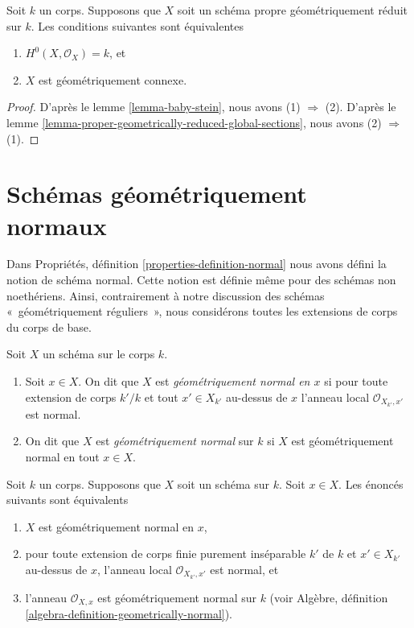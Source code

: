 \begin{lemma}
\label{lemma-geometrically-reduced-stein}
Soit $k$ un corps. Supposons que $X$ soit un schéma propre
géométriquement réduit sur $k$. Les conditions suivantes sont équivalentes
\begin{enumerate}
\item $H^0(X, \mathcal{O}_X) = k$, et
\item $X$ est géométriquement connexe.
\end{enumerate}
\end{lemma}

\begin{proof}
D'après le lemme \ref{lemma-baby-stein}, nous avons (1)
$\Rightarrow$ (2). D'après le lemme
\ref{lemma-proper-geometrically-reduced-global-sections}, nous avons (2) $\Rightarrow$ (1).
\end{proof}




\section{Schémas géométriquement normaux}
\label{section-geometrically-normal}

\noindent
Dans Propriétés, définition
\ref{properties-definition-normal} nous avons défini la
notion de schéma normal. Cette notion est définie même pour
des schémas non noethériens. Ainsi, contrairement à notre
discussion des schémas «~géométriquement réguliers~», nous
considérons toutes les extensions de corps du corps de base.

\begin{definition}
\label{definition-geometrically-normal}
Soit $X$ un schéma sur le corps $k$.
\begin{enumerate}
\item Soit $x \in X$. On dit que $X$ est {\it
géométriquement normal en $x$ } si pour toute extension
de corps $k'/k$ et tout $x' \in X_{k'}$ au-dessus de $x$
l'anneau local $\mathcal{O}_{X_{k'}, x'}$ est normal.
\item On dit que $X$ est {\it géométriquement normal} sur
$k$ si $X$ est géométriquement normal en tout $x \in X$.
\end{enumerate}
\end{definition}

\begin{lemma}
\label{lemma-geometrically-normal-at-point}
Soit $k$ un corps.
Supposons que $X$ soit un schéma
sur $k$. Soit $x \in X$. Les
énoncés suivants sont équivalents
\begin{enumerate}
\item $X$ est géométriquement normal en $x$, \item
pour toute extension de corps finie purement
inséparable $k'$ de $k$ et $x' \in X_{k'}$ au-dessus
de $x$, l'anneau local $\mathcal{O}_{X_{k'}, x'}$
est normal, et \item l'anneau $\mathcal{O}_{X, x}$
est géométriquement normal sur $k$ (voir Algèbre,
définition \ref{algebra-definition-geometrically-normal}).
\end{enumerate}
\end{lemma}

